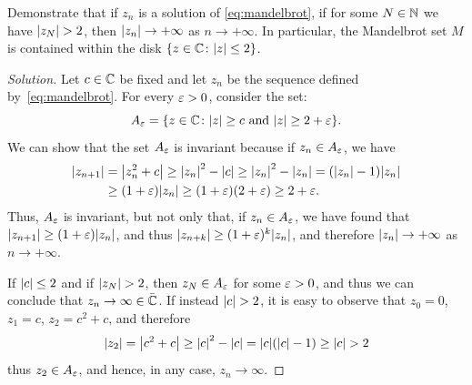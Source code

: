 \begin{exercise}
Demonstrate that if $z_n$ is a solution of \eqref{eq:mandelbrot}, if for some
$N\in {\mathbb N}$ we have ${\left|z_N\right|}> 2$, then ${\left|z_n\right|}\to +\infty$ as $n\to
+\infty$. In particular, the Mandelbrot set $M$ is contained within the disk
${\left\{ z\in {\mathbb C} \colon {\left|z\right|}\le 2 \right\}}$.
\end{exercise}
%
\begin{proof}[Solution]
Let $c\in {\mathbb C}$ be fixed and let $z_n$ be the sequence defined
by~\eqref{eq:mandelbrot}.
For every $\varepsilon>0$, consider the set:
\[
    A_\varepsilon = {\left\{ z \in {\mathbb C} \colon {\left|z\right|}\ge c \text{ and } {\left|z\right|}\ge
  2+\varepsilon \right\}}.
\]
We can show that the set $A_\varepsilon$ is invariant because if $z_n\in A_\varepsilon$, we
have
\begin{equation}\label{eq:473244}
\begin{aligned}
{\left|z_{n+1}\right|}
&= {\left|z_n^2+c\right|}
\ge {\left|z_n\right|}^2 - {\left|c\right|}
\ge {\left|z_n\right|}^2 - {\left|z_n\right|}
= ({\left|z_n\right|}-1){\left|z_n\right|}\\
&\ge (1+\varepsilon){\left|z_n\right|}
\ge (1+\varepsilon)(2+\varepsilon)
\ge 2+\varepsilon.
\end{aligned}
\end{equation}
Thus, $A_\varepsilon$ is invariant, but not only that, if $z_n \in A_\varepsilon$, we have
found that ${\left|z_{n+1}\right|} \ge (1+\varepsilon) {\left|z_n\right|}$, and thus ${\left|z_{n+k}\right|} \ge
(1+\varepsilon)^k {\left|z_n\right|}$, and therefore ${\left|z_n\right|}\to +\infty$ as $n\to +\infty$.

If ${\left|c\right|}\le 2$ and if ${\left|z_N\right|}> 2$, then $z_N \in A_\varepsilon$ for some
$\varepsilon>0$, and thus we can conclude that $z_n\to \infty\in \bar {{\mathbb C}}$.
If instead ${\left|c\right|}>2$, it is easy to observe that $z_0 = 0$, $z_1=c$,
$z_2=c^2+c$, and therefore
\[
  {\left|z_2\right|}
    = {\left|c^2+c\right|}
    \ge {\left|c\right|}^2 - {\left|c\right|}
    = {\left|c\right|}({\left|c\right|}-1)
    \ge {\left|c\right|} > 2
\]
thus $z_2 \in A_\varepsilon$, and hence, in any case, $z_n\to \infty$.

\end{proof}